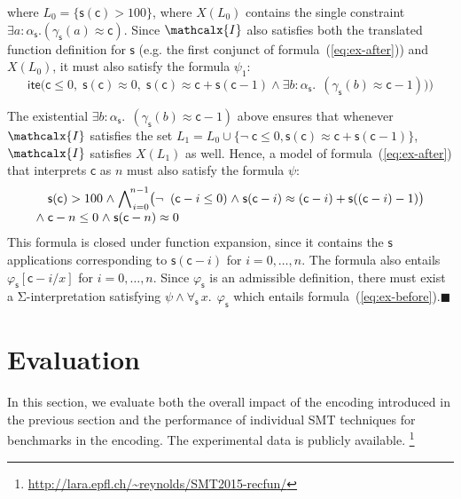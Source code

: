 \documentclass[runningheads,a4paper]{llncs}
\newcommand{\con}[1]{\mathsf{#1}}
\let\oldSigma=\Sigma
\def\Sigma{\mathrm{\oldSigma}}
\let\oldneg=\neg
\def\neg{\oldneg\;}
\let\oldwedge=\wedge
\def\wedge{\mathrel{\oldwedge}}
\newcommand{\teq}{\approx}
\newcommand{\I}{\mathcalx{I}}
\newcommand{\lite}{\con{ite}}
\newcommand\concret{\gamma} %
\newcommand{\forallf}[1]{\forall_{\!#1\:}}
\newcommand{\farg}[1]{\concret_{#1}}
\newcommand{\fargtype}[1]{\alpha_{#1}}
\newcommand{\vthinspace}{\kern+0.083333em}
\newcommand{\absconstraints}{X}
\newcommand\xend{{\hfill$\scriptstyle\blacksquare$}}
\begin{document}
\begin{example}
where $L_0 = \{ \con{s}( \con{c} ) > 100 \}$, 
where $\absconstraints( L_0 )$ contains the single constraint $\exists a : {\fargtype{\con{s}}}. (\farg{\con{s}}( a ) \teq \con{c})$.
Since $\I$ also satisfies both the translated function definition for $\con{s}$ (e.g. the first conjunct of formula~(\ref{eq:ex-after})) 
and $\absconstraints( L_0 )$, it must also satisfy the formula $\psi_1$:
\[
\lite\bigl( \con{c} \leq 0,\; 
            \con{s}(\con{c}) \teq 0,\;
            \con{s}(\con{c}) \teq \con{c} + \con{s}( \con{c}-1 )
            \wedge \exists b : {\fargtype{\con{s}}}.\;\, (\farg{\con{s}}( b ) \teq \con{c}-1) \bigr) \bigr)
\]

The existential $\exists b : {\fargtype{\con{s}}}.\;\, (\farg{\con{s}}( b ) \teq \con{c}-1)$ above
ensures that whenever $\I$ satisfies the set $L_1 = L_0 \cup \{ \neg \con{c} \leq 0, \con{s}(\con{c}) \teq \con{c} + \con{s}( \con{c}-1 ) \}$,
$\I$ satisfies $\absconstraints( L_1 )$ as well.
Hence, a model of formula~(\ref{eq:ex-after}) that interprets $\con{c}$ as $n$ must also satisfy the formula $\psi$:
%
\begin{equation} \label{eq:fun-closure}
\begin{split}
& \con{s}( \con{c} ) > 100 \wedge %
  \bigwedge\nolimits_{\vthinspace i=0}^{\!n-1} \bigl( \neg (\con{c}-i \leq 0) \wedge \con{s}( \con{c}-i ) \teq (\con{c}-i) + \con{s}( (\con{c}-i)-1 ) \bigr) \\[-\jot]
{\wedge}\; & \con{c}-n \leq 0 \wedge \con{s}( \con{c}-n ) \teq 0
\end{split}
\end{equation}
%
This formula is closed under function expansion,
since it contains the $\con{s}$ applications corresponding to
$\con{s}( \con{c}-i )$ for $i = 0, \ldots, n$. The formula also
entails $\varphi_\con{s}[\con{c}-i/x]$ for $i = 0, \ldots, n$.
Since $\varphi_\con{s}$ is an admissible definition,
there must exist a $\Sigma$-interpretation satisfying $\psi \wedge \forallf{\con{s}} x.\;\, \varphi_\con{s}$
which entails formula~(\ref{eq:ex-before}).\xend
\end{example}

\section{Evaluation}
\label{sec:evaluation}

In this section, we evaluate both the overall impact of the encoding introduced
in the previous section and the performance of individual SMT techniques for
benchmarks in the encoding.
The experimental data is publicly available.%
\footnote{\url{http://lara.epfl.ch/~reynolds/SMT2015-recfun/}}
\end{document}
